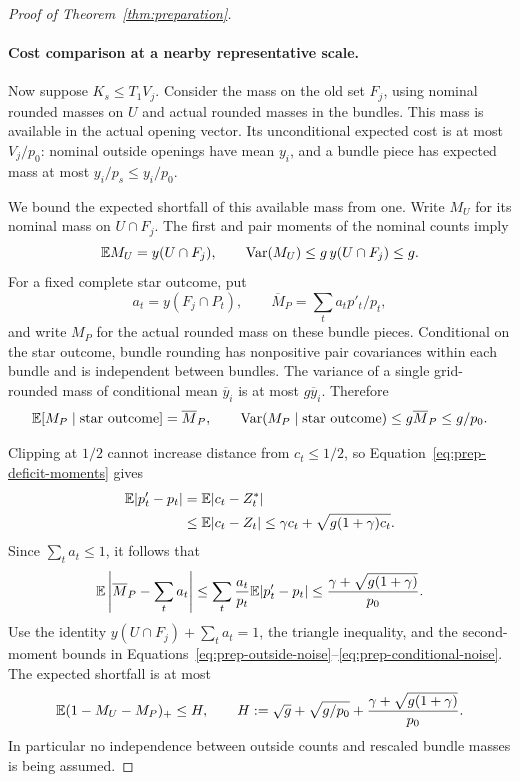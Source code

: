 \begin{proof}[Proof of Theorem~\ref{thm:preparation}]
\paragraph{Cost comparison at a nearby representative scale.}
Now suppose $K_s\le T_1V_j$.  Consider the mass on the old set $F_j$,
using nominal rounded masses on $U$ and actual rounded masses in the
bundles.  This mass is available in the actual opening vector.  Its
unconditional expected cost is at most $V_j/p_0$: nominal outside
openings have mean $y_i$, and a bundle piece has expected mass at most
$y_i/p_s\le y_i/p_0$.

We bound the expected shortfall of this available mass from one.
Write $M_U$ for its nominal mass on $U\cap F_j$.  The first and pair
moments of the nominal counts imply
\begin{equation}\label{eq:prep-outside-noise}
 \mathbb E M_U=y(U\cap F_j),\qquad
 \operatorname{Var}(M_U)\le g\,y(U\cap F_j)\le g.
\end{equation}
For a fixed complete star outcome, put
\[
 a_t=y(F_j\cap P_t),\qquad
 \overline M_P=\sum_t a_t p'_t/p_t,
\]
and write $M_P$ for the actual rounded mass on these bundle pieces.
Conditional on the star outcome, bundle rounding has nonpositive pair
covariances within each bundle and is independent between bundles.
The variance of a single grid-rounded mass of conditional mean
$\overline y_i$ is at most $g\overline y_i$.  Therefore
\begin{equation}\label{eq:prep-conditional-noise}
 \mathbb E[M_P\mid\text{star outcome}]=\overline M_P,\qquad
 \operatorname{Var}(M_P\mid\text{star outcome})
 \le g\overline M_P\le g/p_0.
\end{equation}

Clipping at $1/2$ cannot increase distance from $c_t\le1/2$, so
Equation~\ref{eq:prep-deficit-moments} gives
\begin{align}
 \mathbb E|p'_t-p_t|
 &=\mathbb E|c_t-Z_t^*|\notag\\
 &\le\mathbb E|c_t-Z_t|
 \le\gamma c_t+\sqrt{g(1+\gamma)c_t}.
 \label{eq:prep-rescaling-noise}
\end{align}
Since $\sum_t a_t\le1$, it follows that
\[
 \mathbb E\left|\overline M_P-\sum_t a_t\right|
 \le\sum_t\frac{a_t}{p_t}\mathbb E|p'_t-p_t|
 \le\frac{\gamma+\sqrt{g(1+\gamma)}}{p_0}.
\]
Use the identity $y(U\cap F_j)+\sum_t a_t=1$, the triangle inequality,
and the second-moment bounds in
Equations~\ref{eq:prep-outside-noise}--\ref{eq:prep-conditional-noise}.
The expected shortfall is at most
\begin{equation}\label{eq:prep-shortfall}
 \mathbb E(1-M_U-M_P)_+\le H,
 \qquad
 H:=\sqrt g+\sqrt{g/p_0}
       +\frac{\gamma+\sqrt{g(1+\gamma)}}{p_0}.
\end{equation}
In particular no independence between outside counts and rescaled
bundle masses is being assumed.


\end{proof}

